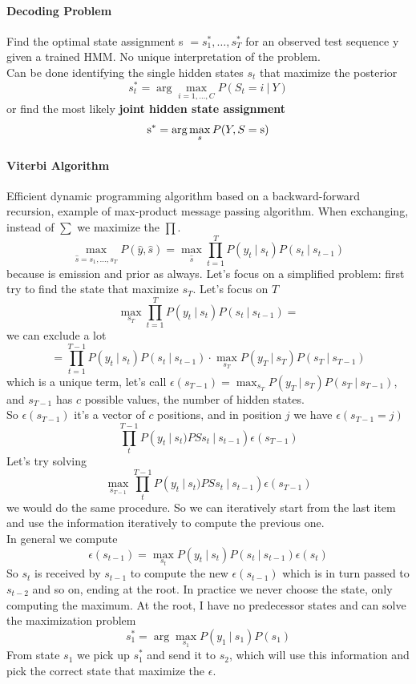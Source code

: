 \documentclass[10pt]{report}
\begin{document}
\paragraph{Decoding Problem} Find the optimal state assignment s $= s_1^*,\ldots,s_T^*$ for an observed test sequence y given a trained HMM. No unique interpretation of the problem.\\
Can be done identifying the single hidden states $s_t$ that maximize the posterior $$s_t^*=\arg\max_{i=1,\ldots,C}P(S_t=i\:|\:Y)$$ 
or find the most likely \textbf{joint hidden state assignment} 
$$\hbox{s}^* = \arg\max_s P(Y,S = \hbox{s})$$
\paragraph{Viterbi Algorithm} Efficient dynamic programming algorithm based on a backward-forward recursion, example of max-product message passing algorithm. When exchanging, instead of $\sum$ we maximize the $\prod$.
$$\max_{\hat{s} = s_1,\ldots,s_T} P(\hat{y},\hat{s}) = \max_{\hat{s}}\prod_{t=1}^T P(y_t\:|\:s_t)P(s_t\:|\:s_{t-1})$$
because is emission and prior as always. Let's focus on a simplified problem: first try to find the state that maximize $s_T$. Let's focus on $T$
$$\max_{s_T}\prod_{t=1}^T P(y_t\:|\:s_t)P(s_t\:|\:s_{t-1})=$$
we can exclude a lot
$$=\prod_{t=1}^{T-1} P(y_t\:|\:s_t)P(s_t\:|\:s_{t-1})\cdot\max_{s_T}P(y_T\:|\:s_T)P(s_T\:|\:s_{T-1})$$
which is a unique term, let's call $\epsilon(s_{T-1}) = \max_{s_T}P(y_T\:|\:s_T)P(s_T\:|\:s_{T-1})$, and $s_{T-1}$ has $c$ possible values, the number of hidden states.\\
So $\epsilon(s_{T-1})$ it's a vector of $c$ positions, and in position $j$ we have $\epsilon(s_{T-1} = j)$
$$\prod_t^{T-1} P(y_t\:|\:s_t)PSs_t\:|\:s_{t-1})\epsilon(s_{T-1})$$
Let's try solving 
$$\max_{s_{T-1}} \prod_t^{T-1} P(y_t\:|\:s_t)PSs_t\:|\:s_{t-1})\epsilon(s_{T-1})$$
we would do the same procedure. So we can iteratively start from the last item and use the information iteratively to compute the previous one.\\
In general we compute $$\epsilon(s_{t-1}) = \max_{s_t} P(y_t\:|\:s_t)P(s_t\:|\:s_{t-1})\epsilon(s_t)$$
So $s_t$ is received by $s_{t-1}$ to compute the new $\epsilon(s_{t-1})$ which is in turn passed to $s_{t-2}$ and so on, ending at the root. In practice we never choose the state, only computing the maximum. At the root, I have no predecessor states and can solve the maximization problem
$$s_1^* = \arg\max_{s_1}P(y_1\:|\:s_1)P(s_1)$$
From state $s_1$ we pick up $s_1^*$ and send it to $s_2$, which will use this information and pick the correct state that maximize the $\epsilon$.
\end{document}
